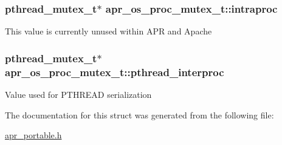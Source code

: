 \subsubsection[{\texorpdfstring{intraproc}{intraproc}}]{\setlength{\rightskip}{0pt plus 5cm}pthread\+\_\+mutex\+\_\+t$\ast$ apr\+\_\+os\+\_\+proc\+\_\+mutex\+\_\+t\+::intraproc}\hypertarget{structapr__os__proc__mutex__t_aa2e01fa37b652185a0dd3fae80caa4ad}{}\label{structapr__os__proc__mutex__t_aa2e01fa37b652185a0dd3fae80caa4ad}
This value is currently unused within A\+PR and Apache 
\subsubsection[{\texorpdfstring{pthread\+\_\+interproc}{pthread_interproc}}]{\setlength{\rightskip}{0pt plus 5cm}pthread\+\_\+mutex\+\_\+t$\ast$ apr\+\_\+os\+\_\+proc\+\_\+mutex\+\_\+t\+::pthread\+\_\+interproc}\hypertarget{structapr__os__proc__mutex__t_aed588bef2efc836e5a768f32638e89c1}{}\label{structapr__os__proc__mutex__t_aed588bef2efc836e5a768f32638e89c1}
Value used for P\+T\+H\+R\+E\+AD serialization 

The documentation for this struct was generated from the following file\+:\begin{DoxyCompactItemize}
\item 
\hyperlink{apr__portable_8h}{apr\+\_\+portable.\+h}\end{DoxyCompactItemize}
